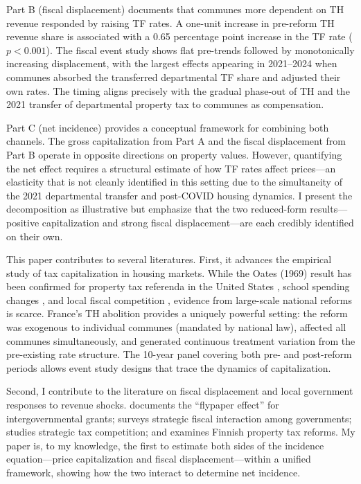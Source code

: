 \documentclass[12pt]{article}
\begin{document}
Part B (fiscal displacement) documents that communes more dependent on TH revenue responded by raising TF rates. A one-unit increase in pre-reform TH revenue share is associated with a 0.65 percentage point increase in the TF rate ($p < 0.001$). The fiscal event study shows flat pre-trends followed by monotonically increasing displacement, with the largest effects appearing in 2021--2024 when communes absorbed the transferred departmental TF share and adjusted their own rates. The timing aligns precisely with the gradual phase-out of TH and the 2021 transfer of departmental property tax to communes as compensation.

Part C (net incidence) provides a conceptual framework for combining both channels. The gross capitalization from Part A and the fiscal displacement from Part B operate in opposite directions on property values. However, quantifying the net effect requires a structural estimate of how TF rates affect prices---an elasticity that is not cleanly identified in this setting due to the simultaneity of the 2021 departmental transfer and post-COVID housing dynamics. I present the decomposition as illustrative but emphasize that the two reduced-form results---positive capitalization and strong fiscal displacement---are each credibly identified on their own.

This paper contributes to several literatures. First, it advances the empirical study of tax capitalization in housing markets. While the Oates (1969) result has been confirmed for property tax referenda in the United States \citep{palmon1998capitalization, starrett1981land}, school spending changes \citep{cellini2010value}, and local fiscal competition \citep{haughwout2004public}, evidence from large-scale national reforms is scarce. France's TH abolition provides a uniquely powerful setting: the reform was exogenous to individual communes (mandated by national law), affected all communes simultaneously, and generated continuous treatment variation from the pre-existing rate structure. The 10-year panel covering both pre- and post-reform periods allows event study designs that trace the dynamics of capitalization.

Second, I contribute to the literature on fiscal displacement and local government responses to revenue shocks. \citet{baicker2004fiscal} documents the ``flypaper effect'' for intergovernmental grants; \citet{brueckner2003strategic} surveys strategic fiscal interaction among governments; \citet{gordon2004tax} studies strategic tax competition; and \citet{lyytikäinen2012tax} examines Finnish property tax reforms. My paper is, to my knowledge, the first to estimate both sides of the incidence equation---price capitalization and fiscal displacement---within a unified framework, showing how the two interact to determine net incidence.
\end{document}

